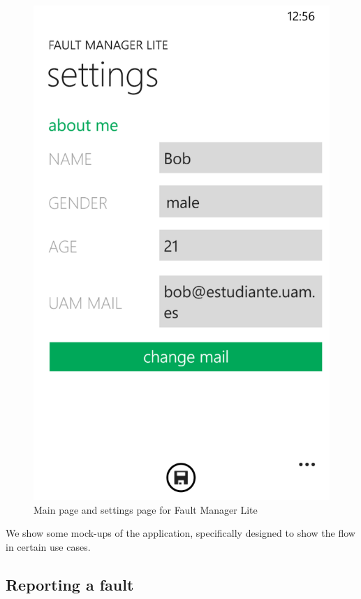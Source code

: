 \documentclass{report}
\begin{document}
\begin{figure}[hbtp]
\begin{minipage}{0.3\textwidth}
\end{minipage}
\hspace{0.1\textwidth}
\begin{minipage}{0.3\textwidth}
\includegraphics[width=\textwidth]{img/Settings.png}
\end{minipage}
\caption{Main page and settings page for Fault Manager Lite}
\label{imgMainPage}
\end{figure}

We show some mock-ups of the application, specifically designed to show the flow in certain use cases.

\subsection{Reporting a fault}
\end{document}
